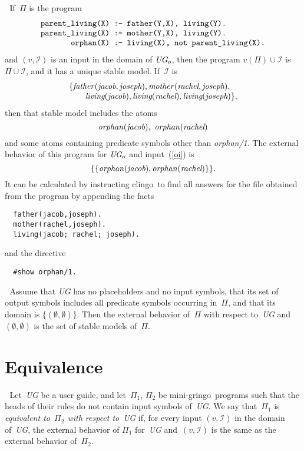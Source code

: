 \documentclass{article}
\def\beq{\begin{equation}}
\def\eeq#1{\label{#1}\end{equation}}
\def\ba{\begin{array}}
\def\ea{\end{array}}
\def\gringo{{\sc gringo}}
\def\clingo{{\sc clingo}}
\newcommand{\I}{\mathcal{I}}
\begin{document}
{\medskip{}$\;$ If~$\Pi$ is the program
\beq\ba l
\verb|parent_living(X) :- father(Y,X), living(Y).|\\
\verb|parent_living(X) :- mother(Y,X), living(Y).|\\
\verb|       orphan(X) :- living(X), not parent_living(X).|
\ea\eeq{orphan1}
and $(v,\I)$ is an input in the domain of $\emph{UG}_o$, then the
program $v(\Pi)\cup\I$ is $\Pi\cup\I$, and it has a unique stable model.
If~$\I$ is
\beq\ba l
\{\emph{father\/}(\emph{jacob},\emph{joseph}),
\emph{mother\/}(\emph{rachel},\emph{joseph}),\\
\quad \quad \emph{living}(\emph{jacob}),
\emph{living}(\emph{rachel}),
\emph{living}(\emph{joseph})\},
\ea\eeq{oi}
then that stable model includes the atoms
$$\emph{orphan\/}(\emph{jacob}),\ \emph{orphan\/}(\emph{rachel})$$
and some atoms containing predicate symbols other than \emph{orphan/1}.
The external behavior of this program for $\emph{UG}_o$ and input~(\ref{oi})
is
\beq
\{\{\emph{orphan\/}(\emph{jacob}),\emph{orphan\/}(\emph{rachel})\}\}.
\eeq{ebor}
It can be calculated by instructing \clingo\ to
find all answers for the file obtained from the program by appending the
facts
\begin{verbatim}
  father(jacob,joseph).
  mother(rachel,joseph).
  living(jacob; rachel; joseph).
\end{verbatim}
and the directive
\begin{verbatim}
  #show orphan/1.
\end{verbatim}

\medskip{}$\;$
Assume that \emph{UG} has no placeholders and no input symbols,
that its set of output symbols includes all predicate symbols occurring
in~$\Pi$, and that its domain is $\{(\emptyset,\emptyset)\}$.  Then
the external
behavior of~$\Pi$ with respect to~\emph{UG} and $(\emptyset,\emptyset)$
is the set of stable models of~$\Pi$.

\section{Equivalence}

$\;$
Let~\emph{UG} be a user guide, and let~$\Pi_1$, $\Pi_2$ be mini-\gringo\
programs such that the heads of their rules do not contain input symbols
of~\emph{UG}.  We say that~$\Pi_1$ is \emph{equivalent to~$\Pi_2$ with
respect to}~\emph{UG} if, for every input $(v,\I)$ in the domain of~\emph{UG},
the external behavior of $\Pi_1$ for~\emph{UG} and~$(v,\I)$ is the
same as the external behavior of~$\Pi_2$.

}
\end{document}

